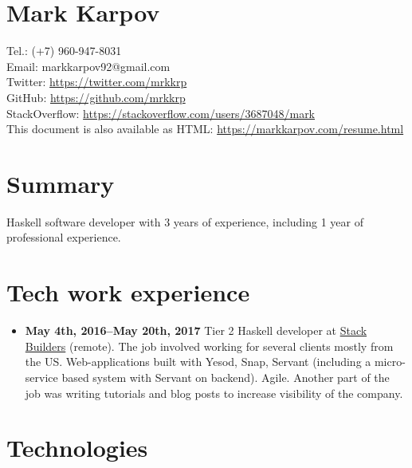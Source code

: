\documentclass[a4paper,12pt]{article}
\begin{document}

\section*{Mark Karpov}

Tel.: (+7) 960-947-8031\\
Email: markkarpov92@gmail.com\\
Twitter: \href{https://twitter.com/mrkkrp}{https://twitter.com/mrkkrp}\\
GitHub: \href{https://github.com/mrkkrp}{https://github.com/mrkkrp}\\
StackOverflow: \href{https://stackoverflow.com/users/3687048/mark}{https://stackoverflow.com/users/3687048/mark}\\
This document is also available as HTML: \href{https://markkarpov.com/resume.html}{https://markkarpov.com/resume.html}

\sectionfont{\fontsize{12}{15}\selectfont\sectionrule{0pt}{0pt}{-5pt}{0.8pt}}

\section*{Summary}

Haskell software developer with 3 years of experience, including 1 year of
professional experience.

\section*{Tech work experience}

\begin{itemize}[noitemsep]
\item \textbf{May 4th, 2016--May 20th, 2017} Tier 2 Haskell developer at
  \href{https://www.stackbuilders.com/}{Stack Builders} (remote). The job
  involved working for several clients mostly from the US. Web-applications
  built with Yesod, Snap, Servant (including a micro-service based system
  with Servant on backend). Agile. Another part of the job was writing
  tutorials and blog posts to increase visibility of the company.
\end{itemize}

\section*{Technologies}
\end{document}
